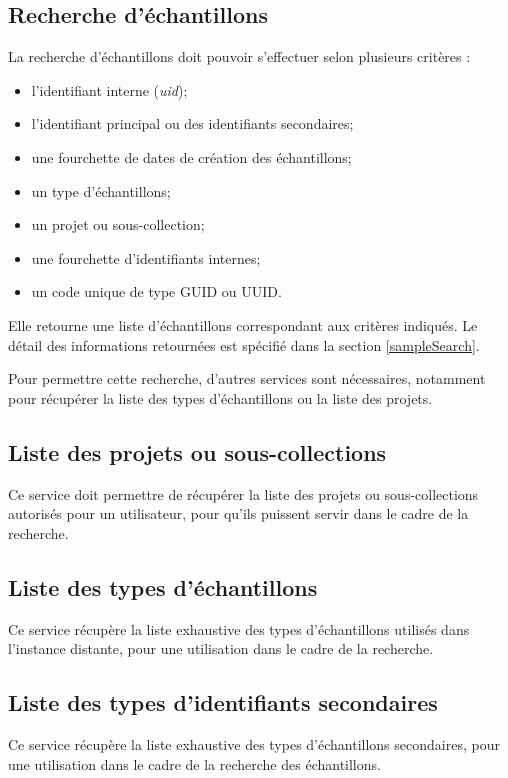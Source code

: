 \subsection{Recherche d'échantillons}
La recherche d'échantillons doit pouvoir s'effectuer selon plusieurs critères :
\begin{itemize}
\item l'identifiant interne (\textit{uid});
\item l'identifiant principal ou des identifiants secondaires;
\item une fourchette de dates de création des échantillons;
\item un type d'échantillons;
\item un projet ou sous-collection;
\item une fourchette d'identifiants internes;
\item un code unique de type GUID ou UUID.
\end{itemize}

Elle retourne une liste d'échantillons correspondant aux critères indiqués. Le détail des informations retournées est spécifié dans la section \ref{sampleSearch}.

Pour permettre cette recherche, d'autres services sont nécessaires, notamment pour récupérer la liste des types d'échantillons ou la liste des projets.

\subsection{Liste des projets ou sous-collections}
Ce service doit permettre de récupérer la liste des projets ou sous-collections autorisés pour un utilisateur, pour qu'ils puissent servir dans le cadre de la recherche.

\subsection{Liste des types d'échantillons}
Ce service récupère la liste exhaustive des types d'échantillons utilisés dans l'instance distante, pour une utilisation dans le cadre de la recherche.

\subsection{Liste des types d'identifiants secondaires}
Ce service récupère la liste exhaustive des types d'échantillons secondaires, pour une utilisation dans le cadre de la recherche des échantillons.

